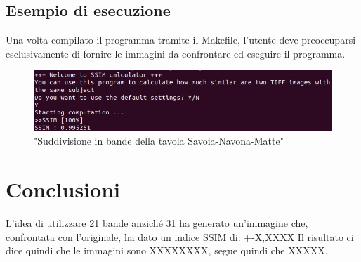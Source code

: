 \documentclass[a4paper,11pt]{article}
\begin{document}
    \subsection{Esempio di esecuzione}
    Una volta compilato il programma tramite il Makefile, l'utente deve preoccuparsi esclusivamente di fornire le immagini da confrontare ed eseguire il programma.
    \begin{figure}[h]
        \centering
        \includegraphics[scale=0.9]{esempio}
        \caption{"Suddivisione in bande della tavola Savoia-Navona-Matte"}
    \end{figure}
    \newpage
    \section{Conclusioni} 
    L'idea di utilizzare 21 bande anziché 31 ha generato un'immagine che, confrontata con l'originale, ha dato un indice SSIM di:
    +-X,XXXX
    Il risultato ci dice quindi che le immagini sono XXXXXXXX, segue quindi che XXXXX.
  
\end{document}
